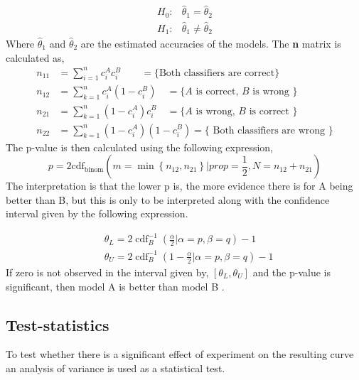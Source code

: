 \documentclass[11pt, fleqn, titlepage]{article}
\begin{document}
\begin{align*}\label{key}
H_0 : & \hat \theta_1 =  \hat \theta_2 \\
H_1 : & \hat \theta_1 \neq  \hat \theta_2
\end{align*}
Where $ \hat \theta_1 $ and $ \hat \theta_2  $ are the estimated accuracies of the models. The \textbf{n} matrix is calculated as, 
\begin{equation*}\label{key}
\begin{aligned}
n_{11} &=\sum_{i=1}^{n} c_{i}^{A} c_{i}^{B} \qquad= \{ \text{Both classifiers are correct} \} \\
n_{12} &=\sum_{k=1}^{n} c_{i}^{A}\left(1-c_{i}^{B}\right) \quad=\{A \text { is correct, } B \text { is wrong }\} \\
n_{21} &=\sum_{k=1}^{n}\left(1-c_{i}^{A}\right) c_{i}^{B} \quad=\{A \text { is wrong, } B \text { is correct }\} \\
n_{22} &=\sum_{k=1}^{n}\left(1-c_{i}^{A}\right)\left(1-c_{i}^{B}\right)=\{\text { Both classifiers are wrong }\}
\end{aligned}
\end{equation*}
\noindent
The p-value is then calculated using the following expression, 
\begin{equation}\label{key}
p=2 \mathrm{cdf}_{\mathrm{binom}}\left(m=\min \left\{n_{12}, n_{21}\right\} | prop=\frac{1}{2}, N=n_{12}+n_{21}\right)
\end{equation}
\noindent
The interpretation is that the lower p is, the more evidence there is for A being better than B, but this is only to be interpreted along with the confidence interval given by the following expression.

\begin{equation}\label{key}
\begin{aligned}
&\theta_{L}=2 \operatorname{cdf}_{B}^{-1}\left(\frac{\alpha}{2} | \alpha=p, \beta=q\right)-1\\
&\theta_{U}=2 \operatorname{cdf}_{B}^{-1}\left(1-\frac{\alpha}{2} | \alpha=p, \beta=q\right)-1
\end{aligned}
\end{equation}
\noindent
If zero is not observed in the interval given by, $ [\theta_{L},\theta_{U}] $ and the p-value is significant, then model A is better than model B \cite{mlbog}.

\subsection*{Test-statistics}
To test whether there is a significant effect of experiment on the resulting curve an analysis of variance is used as a statistical test. 
\end{document}
